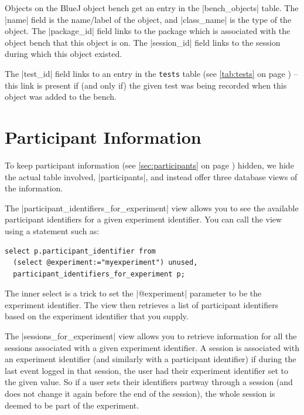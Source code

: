 \documentclass{report}
\newcommand{\myref}[1]{\autoref{#1} on page \pageref*{#1}}
\newcommand{\tabref}[1]{\lstinline|#1| table (see \myref{tab:#1})}
\begin{document}

Objects on the BlueJ object bench get an entry in the |bench_objects|
table.  The |name| field is the name/label of the object, and
|class_name| is the type of the object.  The |package_id| field links
to the package which is associated with the object bench that this
object is on.  The |session_id| field links to the session during
which this object existed.

The |test_id| field links to an entry in the \tabref{tests} -- this
link is present if (and only if) the given test was being recorded
when this object was added to the bench.

\section{Participant Information}
\label{sec:views}

To keep participant information (see \myref{sec:participants}) hidden,
we hide the actual table involved, |participants|, and instead offer three
database views of the information.


The |participant_identifiers_for_experiment| view allows you to see the
available participant identifiers for a given experiment identifier.  You can
call the view using a statement such as:

\begin{lstlisting}
select p.participant_identifier from
  (select @experiment:="myexperiment") unused,
  participant_identifiers_for_experiment p;
\end{lstlisting}

The inner select is a trick to set the |@experiment| parameter to be the
experiment identifier.  The view then retrieves a list of participant
identifiers based on the experiment identifier that you supply.



The |sessions_for_experiment| view allows you to retrieve information for all
the sessions associated with a given experiment identifier.  A session is
associated with an experiment identifier (and similarly with a participant
identifier) if during the last event logged in that session, the user had
their experiment identifier set to the given value.  So if a user sets their
identifiers partway through a session (and does not change it again before the
end of the session), the whole session is deemed to be part of the experiment.
\end{document}
